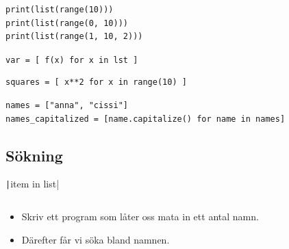 \begin{frame}[fragile]
  \begin{example}
    \begin{verbatim}
print(list(range(10)))
print(list(range(0, 10)))
print(list(range(1, 10, 2)))
    \end{verbatim}
  \end{example}
\end{frame}

\begin{frame}[fragile]
  \texttt{var = [ f(x) for x in lst ]}
\end{frame}

\begin{frame}[fragile]
  \begin{example}
    \begin{verbatim}
squares = [ x**2 for x in range(10) ]
    \end{verbatim}
  \end{example}

  \pause

  \begin{example}
    \begin{verbatim}
names = ["anna", "cissi"]
names_capitalized = [name.capitalize() for name in names]
    \end{verbatim}
  \end{example}
\end{frame}


\subsection{Sökning}

\begin{frame}[fragile]
  \texttt|item in list|
\end{frame}

\begin{frame}[fragile]
  \begin{example}[isin.py]
    \inputminted{python}{examples/isin.py}
  \end{example}
\end{frame}

\begin{frame}[fragile]
  \begin{exercise}[search.py]
    \begin{itemize}
      \item Skriv ett program som låter oss mata in ett antal 
        namn.
      \item Därefter får vi söka bland namnen.
    \end{itemize}
  \end{exercise}
\end{frame}

